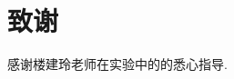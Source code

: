 \documentclass[a4paper]{article}
\begin{document}

\section{致谢}\label{acknowledgments}
感谢楼建玲老师在实验中的的悉心指导.
\end{document}
